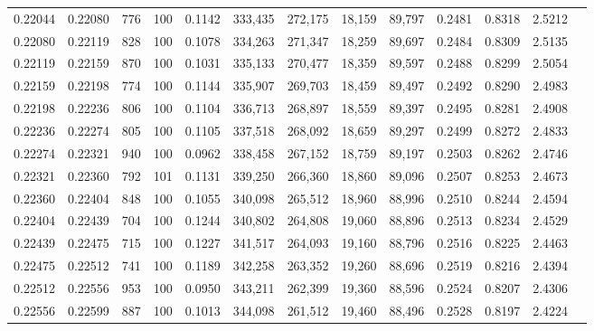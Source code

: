 \begin{tabular}{rrrrrrrrrrrrr}
0.22044 & 0.22080 &   776 & 100 &                                     0.1142 & 333,435 & 272,175 &  18,159 &  89,797 & 0.2481 & 0.8318 & 2.5212 \\
0.22080 & 0.22119 &   828 & 100 &                                     0.1078 & 334,263 & 271,347 &  18,259 &  89,697 & 0.2484 & 0.8309 & 2.5135 \\
0.22119 & 0.22159 &   870 & 100 &                                     0.1031 & 335,133 & 270,477 &  18,359 &  89,597 & 0.2488 & 0.8299 & 2.5054 \\
0.22159 & 0.22198 &   774 & 100 &                                     0.1144 & 335,907 & 269,703 &  18,459 &  89,497 & 0.2492 & 0.8290 & 2.4983 \\
0.22198 & 0.22236 &   806 & 100 &                                     0.1104 & 336,713 & 268,897 &  18,559 &  89,397 & 0.2495 & 0.8281 & 2.4908 \\
0.22236 & 0.22274 &   805 & 100 &                                     0.1105 & 337,518 & 268,092 &  18,659 &  89,297 & 0.2499 & 0.8272 & 2.4833 \\
0.22274 & 0.22321 &   940 & 100 &                                     0.0962 & 338,458 & 267,152 &  18,759 &  89,197 & 0.2503 & 0.8262 & 2.4746 \\
0.22321 & 0.22360 &   792 & 101 &                                     0.1131 & 339,250 & 266,360 &  18,860 &  89,096 & 0.2507 & 0.8253 & 2.4673 \\
0.22360 & 0.22404 &   848 & 100 &                                     0.1055 & 340,098 & 265,512 &  18,960 &  88,996 & 0.2510 & 0.8244 & 2.4594 \\
0.22404 & 0.22439 &   704 & 100 &                                     0.1244 & 340,802 & 264,808 &  19,060 &  88,896 & 0.2513 & 0.8234 & 2.4529 \\
0.22439 & 0.22475 &   715 & 100 &                                     0.1227 & 341,517 & 264,093 &  19,160 &  88,796 & 0.2516 & 0.8225 & 2.4463 \\
0.22475 & 0.22512 &   741 & 100 &                                     0.1189 & 342,258 & 263,352 &  19,260 &  88,696 & 0.2519 & 0.8216 & 2.4394 \\
0.22512 & 0.22556 &   953 & 100 &                                     0.0950 & 343,211 & 262,399 &  19,360 &  88,596 & 0.2524 & 0.8207 & 2.4306 \\
0.22556 & 0.22599 &   887 & 100 &                                     0.1013 & 344,098 & 261,512 &  19,460 &  88,496 & 0.2528 & 0.8197 & 2.4224 \\

\end{tabular}

